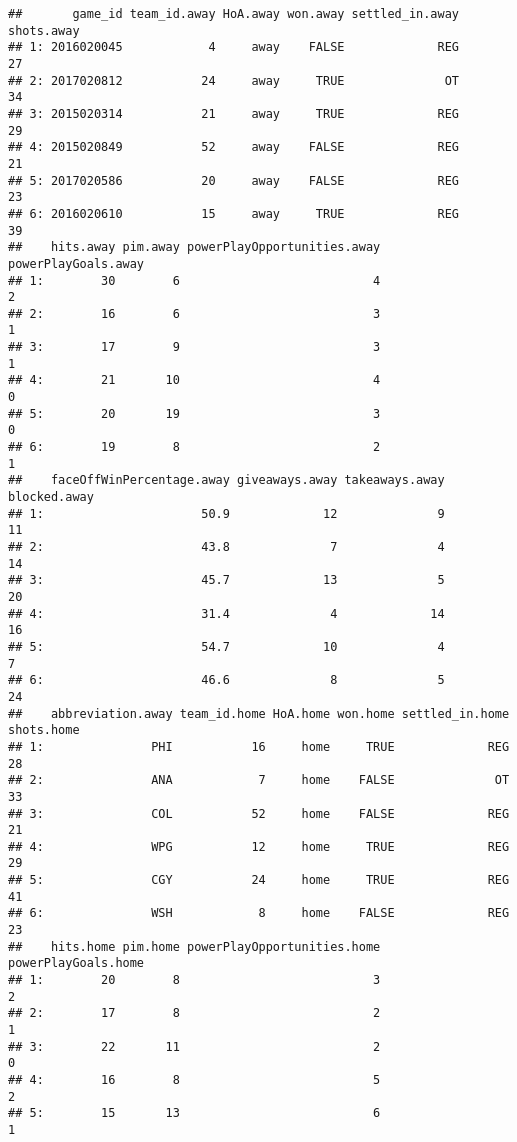 \documentclass[
]{article}
\begin{document}
\begin{verbatim}
##       game_id team_id.away HoA.away won.away settled_in.away shots.away
## 1: 2016020045            4     away    FALSE             REG         27
## 2: 2017020812           24     away     TRUE              OT         34
## 3: 2015020314           21     away     TRUE             REG         29
## 4: 2015020849           52     away    FALSE             REG         21
## 5: 2017020586           20     away    FALSE             REG         23
## 6: 2016020610           15     away     TRUE             REG         39
##    hits.away pim.away powerPlayOpportunities.away powerPlayGoals.away
## 1:        30        6                           4                   2
## 2:        16        6                           3                   1
## 3:        17        9                           3                   1
## 4:        21       10                           4                   0
## 5:        20       19                           3                   0
## 6:        19        8                           2                   1
##    faceOffWinPercentage.away giveaways.away takeaways.away blocked.away
## 1:                      50.9             12              9           11
## 2:                      43.8              7              4           14
## 3:                      45.7             13              5           20
## 4:                      31.4              4             14           16
## 5:                      54.7             10              4            7
## 6:                      46.6              8              5           24
##    abbreviation.away team_id.home HoA.home won.home settled_in.home shots.home
## 1:               PHI           16     home     TRUE             REG         28
## 2:               ANA            7     home    FALSE              OT         33
## 3:               COL           52     home    FALSE             REG         21
## 4:               WPG           12     home     TRUE             REG         29
## 5:               CGY           24     home     TRUE             REG         41
## 6:               WSH            8     home    FALSE             REG         23
##    hits.home pim.home powerPlayOpportunities.home powerPlayGoals.home
## 1:        20        8                           3                   2
## 2:        17        8                           2                   1
## 3:        22       11                           2                   0
## 4:        16        8                           5                   2
## 5:        15       13                           6                   1

\end{verbatim}
\end{document}
